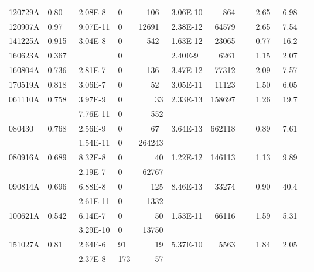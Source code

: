 \documentclass[twocolumn]{aastex61}
\begin{document}
\begin{table*}
\begin{tabular}{l l l l l l l l l l}
120729A  &0.80~~ &  2.08E-8~ & 0 & ~~106  & 3.06E-10 & ~~~864&~~2.65~& 6.98 \\
120907A  &0.97~~ &  9.07E-11 & 0 & 12691  & 2.38E-12 & ~64579&~~2.65~& 7.54 \\
141225A  &0.915~ &  3.04E-8~ & 0 & ~~542  & 1.63E-12 & ~23065&~~0.77~& 16.2 \\
160623A  &0.367~ &           & 0 &        & 2.40E-9~ & ~~6261&~~1.15~& 2.07 \\
160804A  &0.736~ &  2.81E-7~ & 0 & ~~136  & 3.47E-12 & ~77312&~~2.09~& 7.57 \\
170519A  &0.818~ &  3.06E-7  & 0 & ~~~52  & 3.05E-11 & ~11123&~~1.50~& 6.05 \\       
\hline
061110A  & 0.758~&  3.97E-9~ & 0 &~~~~33  & 2.33E-13 &158697~&~~1.26~& 19.7\\
         &       &  7.76E-11 & 0 & ~~~552 &          &       &       &      \\
080430~  & 0.768~&  2.56E-9~ & 0 & ~~~67 & 3.64E-13  &662118~&~~0.89~& 7.61\\       
         &       &  1.54E-11 & 0 & 264243 &          &        &      &       \\  
080916A  & 0.689~&  8.32E-8~ & 0 & ~~~~40 & 1.22E-12 &146113~&~~1.13~& 9.89\\
         &       &  2.19E-7~ & 0 & ~62767 &          &       &       &       \\
090814A  & 0.696~&  6.88E-8~ & 0 & ~~~125 & 8.46E-13 &~33274~& ~~0.90& 40.4\\
         &       &  2.61E-11 & 0 & ~~1332 &          &       &       &       \\
100621A  & 0.542~&  6.14E-7~ & 0 & ~~~~50 & 1.53E-11 &~66116~& ~~1.59& 5.31\\
         &       &  3.29E-10 & 0 & ~13750 &          &       &       &       \\
151027A  & 0.81~~&  2.64E-6  &91 & ~~~~19  & 5.37E-10&~~5563~& ~~1.84& 2.05  \\       
         &       &  2.37E-8  &173& ~~~~57  &         &       &       &         \\
\hline
\end{tabular}
\end{table*}
\end{document}
